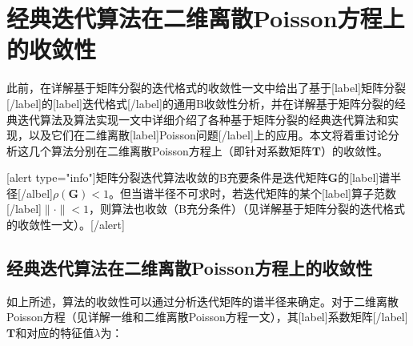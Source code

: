 \documentclass[12pt, UTF8, nofonts]{ctexart}
\begin{document}

\section*{经典迭代算法在二维离散Poisson方程上的收敛性}

此前，在详解基于矩阵分裂的迭代格式的收敛性一文中给出了基于[label]矩阵分裂[/label]的[label]迭代格式[/label]的通用B收敛性分析，并在详解基于矩阵分裂的经典迭代算法及算法实现一文中详细介绍了各种基于矩阵分裂的经典迭代算法和实现，以及它们在二维离散[label]Poisson问题[/label]上的应用。本文将着重讨论分析这几个算法分别在二维离散Poisson方程上（即针对系数矩阵$\boldsymbol{T}$）的收敛性。

[alert type="info"]矩阵分裂迭代算法收敛的B充要条件是迭代矩阵$\boldsymbol{G}$的[label]谱半径[/albel]$\rho(\boldsymbol{G})<1$。但当谱半径不可求时，若迭代矩阵的某个[label]算子范数[/label]$\|\cdot\|<1$，则算法也收敛（B充分条件）（见详解基于矩阵分裂的迭代格式的收敛性一文）。[/alert]

\subsection*{经典迭代算法在二维离散Poisson方程上的收敛性}

如上所述，算法的收敛性可以通过分析迭代矩阵的谱半径来确定。对于二维离散Poisson方程（见详解一维和二维离散Poisson方程一文），其[label]系数矩阵[/label]$\boldsymbol{T}$和对应的特征值$\lambda$为：
\end{document}
